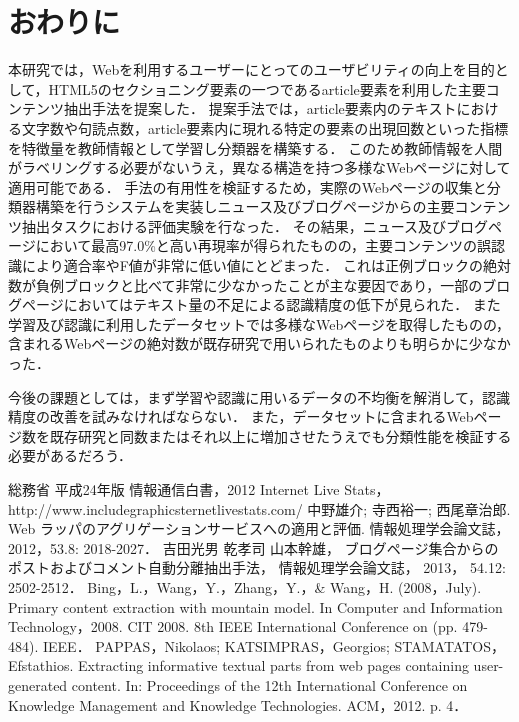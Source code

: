\documentclass[a4paper,10pt,twocolumn]{jsarticle}
\begin{document}
\section{おわりに}

本研究では，Webを利用するユーザーにとってのユーザビリティの向上を目的として，HTML5のセクショニング要素の一つであるarticle要素を利用した主要コンテンツ抽出手法を提案した．
提案手法では，article要素内のテキストにおける文字数や句読点数，article要素内に現れる特定の要素の出現回数といった指標を特徴量を教師情報として学習し分類器を構築する．
このため教師情報を人間がラベリングする必要がないうえ，異なる構造を持つ多様なWebページに対して適用可能である．
手法の有用性を検証するため，実際のWebページの収集と分類器構築を行うシステムを実装しニュース及びブログページからの主要コンテンツ抽出タスクにおける評価実験を行なった．
その結果，ニュース及びブログページにおいて最高97.0\%と高い再現率が得られたものの，主要コンテンツの誤認識により適合率やF値が非常に低い値にとどまった．
これは正例ブロックの絶対数が負例ブロックと比べて非常に少なかったことが主な要因であり，一部のブログページにおいてはテキスト量の不足による認識精度の低下が見られた．
また学習及び認識に利用したデータセットでは多様なWebページを取得したものの，含まれるWebページの絶対数が既存研究で用いられたものよりも明らかに少なかった．

今後の課題としては，まず学習や認識に用いるデータの不均衡を解消して，認識精度の改善を試みなければならない．
また，データセットに含まれるWebページ数を既存研究と同数またはそれ以上に増加させたうえでも分類性能を検証する必要があるだろう．

\begin{thebibliography}{99}
 総務省 平成24年版 情報通信白書，2012
 Internet Live Stats，\\http://www.includegraphicsternetlivestats.com/
 中野雄介; 寺西裕一; 西尾章治郎. Web ラッパのアグリゲーションサービスへの適用と評価. 情報処理学会論文誌，2012，53.8: 2018-2027．
 吉田光男 乾孝司 山本幹雄， ブログページ集合からのポストおよびコメント自動分離抽出手法， 情報処理学会論文誌， 2013， 54.12: 2502-2512．
 Bing，L.，Wang，Y.，Zhang，Y.，\& Wang，H. (2008，July). Primary content extraction with mountain model. In Computer and Information Technology，2008. CIT 2008. 8th IEEE International Conference on (pp. 479-484). IEEE．
 PAPPAS，Nikolaos; KATSIMPRAS，Georgios; STAMATATOS，Efstathios. Extracting informative textual parts from web pages containing user-generated content. In: Proceedings of the 12th International Conference on Knowledge Management and Knowledge Technologies. ACM，2012. p. 4．
\end{thebibliography}
\end{document}
